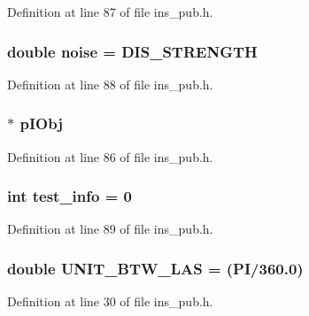 Definition at line 87 of file ins\_\-pub.h.

\subsubsection[{noise}]{\setlength{\rightskip}{0pt plus 5cm}double {\bf noise} = DIS\_\-STRENGTH}\label{ins__pub_8h_aedb3acb007b8cca8efc63eed08f45705}


Definition at line 88 of file ins\_\-pub.h.

\subsubsection[{pIObj}]{$\ast$ {\bf pIObj}}\label{ins__pub_8h_aba39bde455b1a2ce9784bec3b52ebd49}


Definition at line 86 of file ins\_\-pub.h.

\subsubsection[{test\_\-info}]{\setlength{\rightskip}{0pt plus 5cm}int {\bf test\_\-info} = 0}\label{ins__pub_8h_aba44f1379e8e30d4041e9f6d07fc33e0}


Definition at line 89 of file ins\_\-pub.h.

\subsubsection[{UNIT\_\-BTW\_\-LAS}]{\setlength{\rightskip}{0pt plus 5cm}double {\bf UNIT\_\-BTW\_\-LAS} = (PI/360.0)}\label{ins__pub_8h_aa4a18312d42e276842d0bcd85bd42532}


Definition at line 30 of file ins\_\-pub.h.

